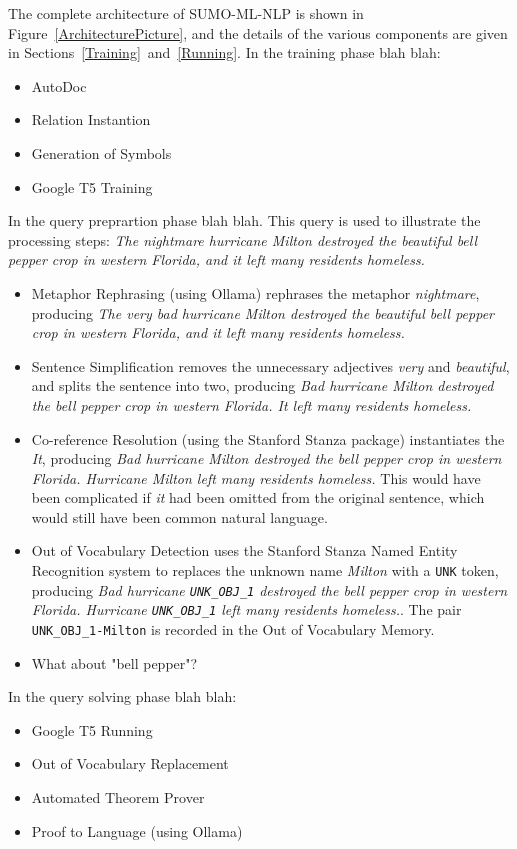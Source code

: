 \documentclass[runningheads]{llncs}
\begin{document}
The complete architecture of SUMO-ML-NLP is shown in Figure~\ref{ArchitecturePicture}, and the
details of the various components are given in Sections~\ref{Training}~and~\ref{Running}.
In the training phase blah blah:
\begin{itemize}
\item AutoDoc
\item Relation Instantion
\item Generation of Symbols
\item Google T5 Training
\end{itemize}

In the query preprartion phase blah blah.
This query is used to illustrate the processing steps:
\emph{The nightmare hurricane Milton destroyed the beautiful bell pepper crop in western Florida, 
and it left many residents homeless.}
\begin{itemize}
\item Metaphor Rephrasing (using Ollama) rephrases the metaphor \emph{nightmare}, producing 
      \emph{The very bad hurricane Milton destroyed the beautiful bell pepper crop in western 
      Florida, and it left many residents homeless.}
\item Sentence Simplification removes the unnecessary adjectives \emph{very} and \emph{beautiful}, 
      and splits the sentence into two, producing \emph{Bad hurricane Milton destroyed the bell 
      pepper crop in western Florida. It left many residents homeless.}
\item Co-reference Resolution (using the Stanford Stanza package) instantiates the \emph{It}, 
      producing \emph{Bad hurricane Milton destroyed the bell pepper crop in western Florida. 
      Hurricane Milton left many residents homeless.}
      This would have been complicated if \emph{it} had been omitted from the original sentence,
      which would still have been common natural language.
\item Out of Vocabulary Detection uses the Stanford Stanza Named Entity Recognition system to
      replaces the unknown name \emph{Milton} with a \texttt{UNK} token, producing \emph{Bad 
      hurricane \texttt{UNK\_OBJ\_1} destroyed the bell pepper crop in western Florida.
      Hurricane \texttt{UNK\_OBJ\_1} left many residents homeless.}.
      The pair \texttt{UNK\_OBJ\_1-Milton} is recorded in the Out of Vocabulary Memory.
\item What about "bell pepper"?
\end{itemize}

In the query solving phase blah blah:
\begin{itemize}
\item Google T5 Running
\item Out of Vocabulary Replacement
\item Automated Theorem Prover
\item Proof to Language (using Ollama)
\end{itemize}
\end{document}
